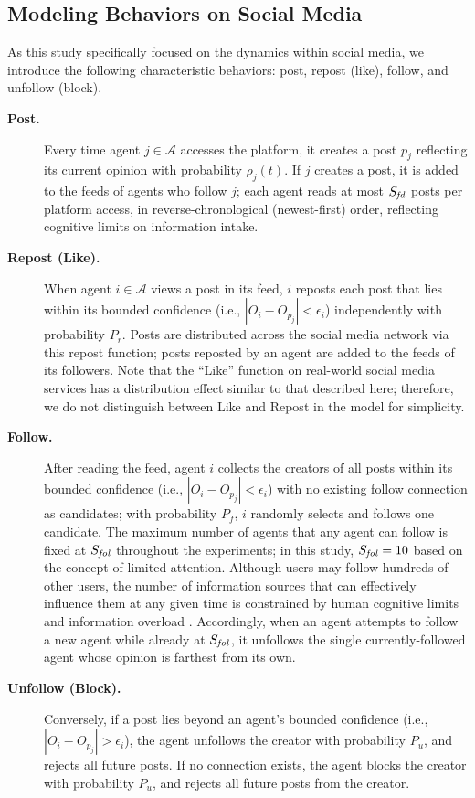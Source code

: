 \documentclass[pdflatex,sn-mathphys-num]{sn-jnl}%
\theoremstyle{thmstyleone}%
\theoremstyle{thmstyletwo}%
\theoremstyle{thmstylethree}%
\def\AgentSet{\mathcal{A}}
\def\post{\rho} %
\def\BoundedConfidence{\epsilon}
\def\maxfollower{S_{\it fol}}
\def\maxfeed{S_{\it fd}}
\begin{document}
\subsection{Modeling Behaviors on Social Media}
As this study specifically focused on the dynamics within social
media, we introduce the following characteristic behaviors: 
post, repost (like), follow, and unfollow (block).

\begin{description}
\item[{\bf Post.}] Every time agent $j\in\AgentSet$ accesses the
  platform, it creates a post $p_j$ reflecting its current opinion
  with probability $\post_j(t)$. If $j$ creates a post, it is added to
  the feeds of agents who follow $j$; each agent reads at most $\maxfeed$ posts per platform access, in reverse-chronological (newest-first) order, reflecting cognitive limits on information intake.

\item[{\bf Repost (Like).}] When agent $i\in\AgentSet$ views a post in its
  feed, $i$ reposts each post that lies within its bounded confidence
  (i.e., $|O_i - O_{p_j}| <
  \BoundedConfidence_i$) independently with probability $P_r$. Posts are distributed across the social
  media network via this repost function; posts reposted by an agent
  are added to the feeds of its followers. Note that the ``Like''
  function on real-world social media services has a distribution effect
  similar to that described here; therefore, we do not distinguish
  between Like and Repost in the model for simplicity.

\item[{\bf Follow.}] After reading the feed, agent $i$ collects the creators of all posts within its bounded confidence (i.e., $|O_i - O_{p_j}| < \BoundedConfidence_i$) with no existing follow connection as candidates; with probability $P_f$, $i$ randomly selects and follows one candidate.
The maximum number of agents that any agent can follow is fixed at $\maxfollower$ throughout the experiments; in this study, $\maxfollower=10$ based on the concept of limited attention. 
Although users may follow hundreds of other users, the number 
of information sources that can effectively influence them 
at any given time is constrained by human cognitive limits 
and information overload \cite{Goncalves2011,Weng2012}.
Accordingly, when an agent attempts to follow a new agent while already at $\maxfollower$, it unfollows the single currently-followed agent whose opinion is farthest from its own.

\item[{\bf Unfollow (Block).}] Conversely, if a post lies beyond an agent's bounded confidence (i.e., $|O_i - O_{p_j}| > \BoundedConfidence_i$), the agent unfollows the creator with probability $P_u$, and rejects all future posts. If no connection exists, the agent blocks the creator with probability $P_u$, and rejects all future posts from the creator.
\end{description}
\par
\end{document}

